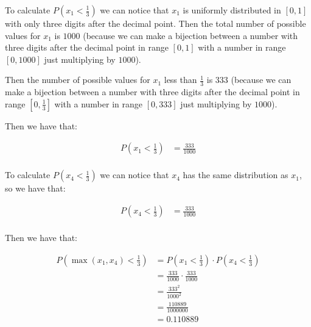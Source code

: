 To calculate $P(x_1 < \frac{1}{3})$ we can notice that $x_1$ is
uniformly distributed in $[0,1]$ with only three digits after the
decimal point. Then the total number of possible values for $x_1$ is
$1000$ (because we can make a bijection between a number with three
digits after the decimal point in range $[0,1]$ with a number in
range $[0,1000]$ just multiplying by $1000$).

Then the number of possible values for $x_1$ less than $\frac{1}{3}$
is $333$ (because we can make a bijection between a number with three
digits after the decimal point in range $[0,\frac{1}{3}]$ with a
number in range $[0,333]$ just multiplying by $1000$).

Then we have that:

\begin{equation*}
    \begin{split}
        P(x_1 < \frac{1}{3}) & = \frac{333}{1000} \\
    \end{split}
\end{equation*}

To calculate $P(x_4 < \frac{1}{3})$ we can notice that $x_4$ has
the same distribution as $x_1$, so we have that:

\begin{equation*}
    \begin{split}
        P(x_4 < \frac{1}{3}) & = \frac{333}{1000} \\
    \end{split}
\end{equation*}

Then we have that:

\begin{equation*}
    \begin{split}
        P(\max(x_1, x_4) < \frac{1}{3}) & = P(x_1 < \frac{1}{3}) \cdot P(x_4 < \frac{1}{3}) \\
                                        & = \frac{333}{1000} \cdot \frac{333}{1000}         \\
                                        & = \frac{333^2}{1000^2}                            \\
                                        & = \frac{110889}{1000000}                          \\
                                        & = 0.110889
    \end{split}
\end{equation*}